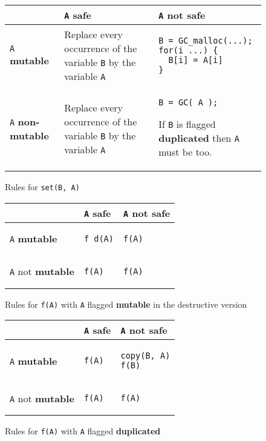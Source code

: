 \documentclass[12pt,a4paper]{article}
\newcommand{\cl}[1]{\texttt{#1}}
\newcommand{\mut}{  \textbf{ mutable } }
\newcommand{\nmut}{ \textbf{ non-mutable } }
\newcommand{\bang}{ \textbf{ mutable } }
\newcommand{\safe}{ \textbf{ safe } }
\newcommand{\dupl}{ \textbf{ duplicated } }
\begin{document}
\begin{figure}[!ht]
\begin{tabular}{|p{5.5cm}|p{5.5cm}|p{6cm}|}
\hline
             & \cl{A} \safe & \cl{A} not \safe \\ \hline
\cl{A} \mut  & Replace every occurrence of the variable \cl{B} by the variable \cl{A} & \begin{lstlisting}
B = GC_malloc(...);
for(i ...) {
  B[i] = A[i]
}
\end{lstlisting} \\ \hline
\cl{A} \nmut & Replace every occurrence of the variable \cl{B} by the variable \cl{A} & \begin{lstlisting}
B = GC( A );
\end{lstlisting}
If \cl{B} is flagged \dupl then \cl{A} must be too.
\\ \hline
\end{tabular}
\caption{Rules for \cl{set(B, A)}}
\end{figure}



\begin{figure}[!ht]
\begin{tabular}{|p{5.5cm}|p{5.5cm}|p{6cm}|}
\hline
             & \cl{A} \safe & \cl{A} not \safe \\ \hline
\cl{A} \bang  &
\begin{lstlisting}
f_d(A)
\end{lstlisting} & \begin{lstlisting}
f(A)
\end{lstlisting} \\ \hline
\cl{A} not \bang & \begin{lstlisting}
f(A)
\end{lstlisting} & \begin{lstlisting}
f(A)
\end{lstlisting} \\ \hline
\end{tabular}
\caption{Rules for \cl{f(A)} with \cl{A} flagged \bang in the destructive version}
\end{figure}


\begin{figure}[!ht]
\begin{tabular}{|p{5.5cm}|p{5.5cm}|p{6cm}|}
\hline
             & \cl{A} \safe & \cl{A} not \safe \\ \hline
\cl{A} \bang  &
\begin{lstlisting}
f(A)
\end{lstlisting} & \begin{lstlisting}
copy(B, A)
f(B)
\end{lstlisting} \\ \hline
\cl{A} not \bang & \begin{lstlisting}
f(A)
\end{lstlisting} & \begin{lstlisting}
f(A)
\end{lstlisting} \\ \hline
\end{tabular}
\caption{Rules for \cl{f(A)} with \cl{A} flagged \dupl}
\end{figure}
\end{document}
